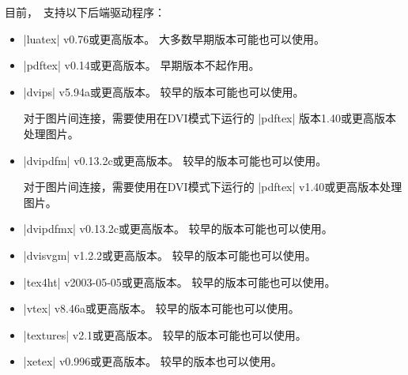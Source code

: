
目前，\pgfname\ 支持以下后端驱动程序：
%
\begin{itemize}
    \item |luatex| v0.76或更高版本。 大多数早期版本可能也可以使用。
    \item |pdftex| v0.14或更高版本。 早期版本不起作用。
    \item |dvips| v5.94a或更高版本。 较早的版本可能也可以使用。
    

    对于图片间连接，需要使用在DVI模式下运行的 |pdftex| 版本1.40或更高版本处理图片。

    \item |dvipdfm| v0.13.2c或更高版本。 较早的版本可能也可以使用。


    对于图片间连接，需要使用在DVI模式下运行的 |pdftex| v1.40或更高版本处理图片。
    \item |dvipdfmx| v0.13.2c或更高版本。 较早的版本可能也可以使用。
    \item |dvisvgm| v1.2.2或更高版本。 较早的版本可能也可以使用。
    \item |tex4ht| v2003-05-05或更高版本。 较早的版本可能也可以使用。
    \item |vtex| v8.46a或更高版本。 较早的版本可能也可以使用。
    \item |textures| v2.1或更高版本。 较早的版本可能也可以使用。
    \item |xetex| v0.996或更高版本。 较早的版本也可以使用。
\end{itemize}

